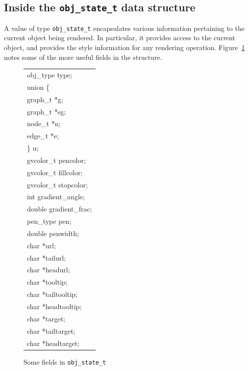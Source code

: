 \subsection{Inside the {\tt obj\_state\_t} data structure}
\label{sec:obj}
A value of type {\tt obj\_state\_t} encapsulates various information
pertaining to the current object being rendered. In particular, it
provides access to the current object, and provides the style
information for any rendering operation.
Figure~\ref{fig:obj} notes some of the more useful fields in the
structure. 
\begin{figure}[htb]
\centering
\begin{tabular}{|l|} \hline
obj\_type type; \\
union \{ \\
\multicolumn{1}{|l|}{\hspace{2em}graph\_t *g;} \\
\multicolumn{1}{|l|}{\hspace{2em}graph\_t *sg;} \\
\multicolumn{1}{|l|}{\hspace{2em}node\_t *n;} \\
\multicolumn{1}{|l|}{\hspace{2em}edge\_t *e;} \\
\} u; \\
gvcolor\_t pencolor; \\
gvcolor\_t fillcolor; \\
gvcolor\_t stopcolor; \\
int gradient\_angle; \\
double gradient\_frac; \\
pen\_type pen;   \\
double penwidth; \\
char *url; \\
char *tailurl;  \\
char *headurl;  \\
char *tooltip; \\
char *tailtooltip; \\
char *headtooltip; \\
char *target; \\
char *tailtarget; \\
char *headtarget; \\
\hline
\end{tabular}
\caption{Some fields in {\tt obj\_state\_t}}
\label{fig:obj}
\end{figure}

